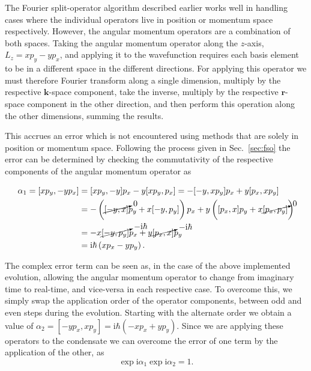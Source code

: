 The Fourier split-operator algorithm described earlier works well in handling cases where the individual operators live in position or momentum space respectively. However, the angular momentum operators are a combination of both spaces. Taking the angular momentum operator along the $z$-axis, $L_z = xp_y - yp_x$, and applying it to the wavefunction requires each basis element to be in a different space in the different directions. For applying this operator we must therefore Fourier transform along a single dimension, multiply by the respective $\mathbf{k}$-space component, take the inverse, multiply by the respective $\mathbf{r}$-space component in the other direction, and then perform this operation along the other dimensions, summing the results.

This accrues an error which is not encountered using methods that are solely in position or momentum space. Following the process given in Sec.~\ref{sec:fso} the error can be determined by checking the commutativity of the respective components of the angular momentum operator as

 \begin{align}
 	\alpha_1 = [x p_y,-y p_x] &= [x p_y,-y] p_x  -  y[x p_y,p_x] = -[-y,x p_y] p_x + y [p_x, x p_y] \nonumber \\
 		&= -\left( {\cancelto{0}{[-y,x]}} p_y + x [-y,p_y] \right) p_x + y \left( [p_x,x] p_y + x {\cancelto{0}{[p_x,p_y]}} \right) \nonumber \\
 		&= -x {\cancelto{-\textrm{i}\hbar}{[-y, p_y]}} p_x + y {\cancelto{-\textrm{i}\hbar}{[p_x,x]}} p_y \nonumber \\
        &= \textrm{i}\hbar \left(x p_x - y p_y \right).
 \end{align}

 The complex error term can be seen as, in the case of the above implemented evolution, allowing the angular momentum operator to change from imaginary time to real-time, and vice-versa in each respective case. To overcome this, we simply swap the application order of the operator components, between odd and even steps during the evolution. Starting with the alternate order we obtain a value of $\alpha_2 = [-y p_x, x p_y] = \textrm{i}\hbar \left(-x p_x + y p_y \right)$. Since we are applying these operators to the condensate we can overcome the error of one term by the application of the other, as
 \begin{equation}
 \exp{\textrm{i} \alpha_1}\exp{\textrm{i} \alpha_2} = 1.
 \end{equation}

